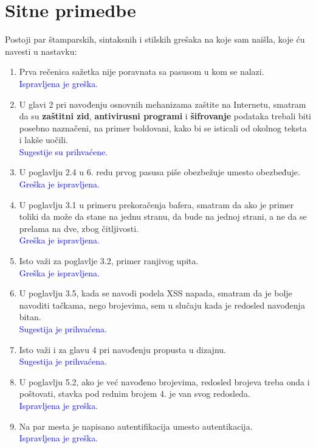 \documentclass[a4paper]{report}
\newcommand{\odgovor}[1]{\textcolor{blue}{#1}}
\begin{document}
\section{Sitne primedbe}
Postoji par štamparskih, sintaksnih i stilskih grešaka na koje sam naišla, koje ću navesti u nastavku:
\begin{enumerate}
\item Prva rečenica sažetka nije poravnata sa pasusom u kom se nalazi.\\
\odgovor{Ispravljena je greška.}
\item U glavi 2 pri navođenju osnovnih mehanizama zaštite na Internetu, smatram da su \textbf{zaštitni zid}, \textbf{antivirusni programi} i \textbf{šifrovanje} podataka trebali biti posebno naznačeni, na primer boldovani, kako bi se isticali od okolnog teksta i lakše uočili.\\
\odgovor{Sugestije su prihvaćene.}
\item U poglavlju 2.4 u 6. redu prvog pasusa piše obezbežuje umesto obezbeđuje.\\
\odgovor{Greška je ispravljena.}
\item U poglavlju 3.1 u primeru prekoračenja bafera, smatram da ako je primer toliki da može da stane na jednu stranu, da bude na jednoj strani, a ne da se prelama na dve, zbog čitljivosti.\\
\odgovor{Greška je ispravljena.}
\item Isto važi za poglavlje 3.2, primer ranjivog upita.\\
\odgovor{Greška je ispravljena.}
\item U poglavlju 3.5, kada se navodi podela XSS napada, smatram da je bolje navoditi tačkama, nego brojevima, sem u slučaju kada je redosled navođenja bitan.\\
\odgovor{Sugestija je prihvaćena.}
\item Isto važi i za glavu 4 pri navođenju propusta u dizajnu.\\
\odgovor{Sugestija je prihvaćena.}
\item U poglavlju 5.2, ako je već navođeno brojevima, redosled brojeva treba onda i poštovati, stavka pod rednim brojem 4. je van svog redosleda.\\
\odgovor{Ispravljena je greška.}
\item Na par mesta je napisano autentifikacija umesto autentikacija.\\
\odgovor{Ispravljena je greška.}
\end{enumerate}
\end{document}
